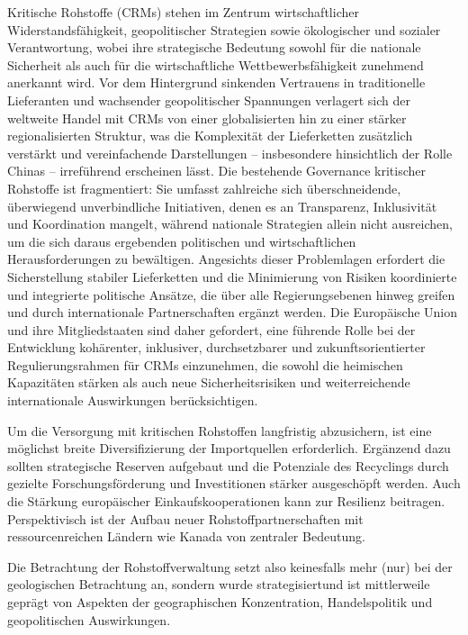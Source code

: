 \documentclass[12pt,a4paper,oneside]{book} %
\begin{document}
Kritische Rohstoffe (CRMs) stehen im Zentrum wirtschaftlicher Widerstandsfähigkeit, geopolitischer Strategien sowie ökologischer und sozialer Verantwortung, wobei ihre strategische Bedeutung sowohl für die nationale Sicherheit als auch für die wirtschaftliche Wettbewerbsfähigkeit zunehmend anerkannt wird. Vor dem Hintergrund sinkenden Vertrauens in traditionelle Lieferanten und wachsender geopolitischer Spannungen verlagert sich der weltweite Handel mit CRMs von einer globalisierten hin zu einer stärker regionalisierten Struktur, was die Komplexität der Lieferketten zusätzlich verstärkt und vereinfachende Darstellungen – insbesondere hinsichtlich der Rolle Chinas – irreführend erscheinen lässt. Die bestehende Governance kritischer Rohstoffe ist fragmentiert: Sie umfasst zahlreiche sich überschneidende, überwiegend unverbindliche Initiativen, denen es an Transparenz, Inklusivität und Koordination mangelt, während nationale Strategien allein nicht ausreichen, um die sich daraus ergebenden politischen und wirtschaftlichen Herausforderungen zu bewältigen. Angesichts dieser Problemlagen erfordert die Sicherstellung stabiler Lieferketten und die Minimierung von Risiken koordinierte und integrierte politische Ansätze, die über alle Regierungsebenen hinweg greifen und durch internationale Partnerschaften ergänzt werden. Die Europäische Union und ihre Mitgliedstaaten sind daher gefordert, eine führende Rolle bei der Entwicklung kohärenter, inklusiver, durchsetzbarer und zukunftsorientierter Regulierungsrahmen für CRMs einzunehmen, die sowohl die heimischen Kapazitäten stärken als auch neue Sicherheitsrisiken und weiterreichende internationale Auswirkungen berücksichtigen.

Um die Versorgung mit kritischen Rohstoffen langfristig abzusichern, ist eine möglichst breite Diversifizierung der Importquellen erforderlich. Ergänzend dazu sollten strategische Reserven aufgebaut und die Potenziale des Recyclings durch gezielte Forschungsförderung und Investitionen stärker ausgeschöpft werden. Auch die Stärkung europäischer Einkaufskooperationen kann zur Resilienz beitragen. Perspektivisch ist der Aufbau neuer Rohstoffpartnerschaften mit ressourcenreichen Ländern wie Kanada von zentraler Bedeutung. 

Die Betrachtung der Rohstoffverwaltung setzt also keinesfalls mehr (nur) bei der geologischen Betrachtung an, sondern wurde \glqq strategisiert\grqq und ist mittlerweile geprägt von Aspekten der geographischen Konzentration, Handelspolitik und geopolitischen Auswirkungen.


\printbibliography 
\end{document}
